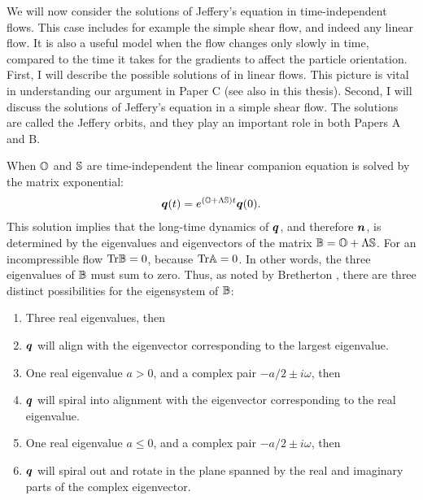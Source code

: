 \documentclass[thesis.tex]{subfiles}
\begin{document}
We will now consider the solutions of Jeffery's equation in time-independent flows. This case includes for example the simple shear flow, and indeed any linear flow. It is also a useful model when the flow changes only slowly in time, compared to the time it takes for the gradients to affect the particle orientation. First, I will describe the possible solutions of  in linear flows. This picture is vital in understanding our argument in Paper C (see also  in this thesis). Second, I will discuss the solutions of Jeffery's equation in a simple shear flow. The solutions are called the Jeffery orbits, and they play an important role in both Papers A and B.

When $\mathbb{O}$ and $\mathbb{S}$ are time-independent the linear companion equation  is solved by the matrix exponential:
\begin{align*}
		\mbox{\boldmath$q$}(t) = e^{(\mathbb{O} + \Lambda \mathbb{S})t}\mbox{\boldmath$q$}(0).
\end{align*}
This solution implies that the long-time dynamics of $\mbox{\boldmath$q$}$, and therefore $\mbox{\boldmath$n$}$, is determined by the eigenvalues and eigenvectors of the matrix $\mathbb{B} = \mathbb{O} + \Lambda\mathbb{S}$. For an incompressible flow $\mbox{Tr}\mathbb{B}=0$, because $\mbox{Tr}\mathbb{A}=0$. In other words, the three eigenvalues of $\mathbb{B}$ must sum to zero. Thus, as noted by Bretherton \cite{bretherton1962}, there are three distinct possibilities for the eigensystem of $\mathbb{B}$:
\begin{enumerate}
	\item Three real eigenvalues, then
	\item[] $\mbox{\boldmath$q$}$ will align with the eigenvector corresponding to the largest eigenvalue.
	\item One real eigenvalue $a>0$, and a complex pair $-a/2 \pm i\omega$, then
	\item[] $\mbox{\boldmath$q$}$ will spiral into alignment with the eigenvector corresponding to the real eigenvalue.
	\item One real eigenvalue $a\leq0$, and a complex pair $-a/2 \pm i\omega$, then
	\item[] $\mbox{\boldmath$q$}$ will spiral out and rotate in the plane spanned by the real and imaginary parts of the complex eigenvector.
\end{enumerate}
\end{document}
